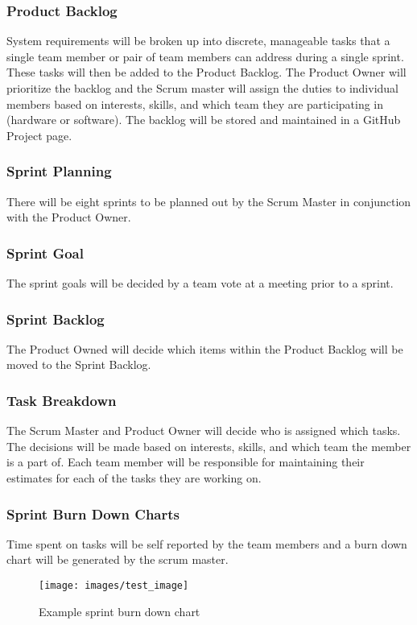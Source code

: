 \subsubsection{Product Backlog}
System requirements will be broken up into discrete, manageable tasks that a single team member or pair of team members can address during a single sprint. These tasks will then be added to the Product Backlog. The Product Owner will prioritize the backlog and the Scrum master will assign the duties to individual members based on interests, skills, and which team they are participating in (hardware or software). The backlog will be stored and maintained in a GitHub Project page.

\subsubsection{Sprint Planning}
There will be eight sprints to be planned out by the Scrum Master in conjunction with the Product Owner.

\subsubsection{Sprint Goal}
The sprint goals will be decided by a team vote at a meeting prior to a sprint.

\subsubsection{Sprint Backlog}
The Product Owned will decide which items within the Product Backlog will be moved to the Sprint Backlog.

\subsubsection{Task Breakdown}
The Scrum Master and Product Owner will decide who is assigned which tasks. The decisions will be made based on interests, skills, and which team the member is a part of. Each team member will be responsible for maintaining their estimates for each of the tasks they are working on.

\subsubsection{Sprint Burn Down Charts}
Time spent on tasks will be self reported by the team members and a burn down chart will be generated by the scrum master.

\begin{figure}[h!]
    \centering
    \texttt{[image: images/test\_image]}
    \caption{Example sprint burn down chart}
\end{figure}


